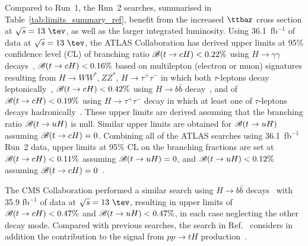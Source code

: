 Compared to Run~1, the Run~2 searches, summarised in Table~\ref{tab:limits_summary_ref}, benefit from the increased $\ttbar$ cross section at $\sqrt{s}=13~\tev$, as well as the larger integrated luminosity.
Using 36.1~fb$^{-1}$ of data at $\sqrt{s}=13~\tev$, the ATLAS Collaboration has derived upper limits at 95\% confidence level (CL) of branching ratio
$\mathscr{B}(t\to cH)<0.22\%$ using $H\to \gamma\gamma$ decays~\cite{Aaboud:2017mfd}, $\mathscr{B}(t\to cH)<0.16\%$ based on
multilepton (electron or muon) signatures resulting from 
$H \to  WW^*, ZZ^*$, $H\to \tau^+\tau^-$ in which both $\tau$-leptons decay leptonically~\cite{Aaboud:2018pob},
$\mathscr{B}(t\to cH)<0.42\%$ using $H\to b\bar{b}$ decay~\cite{fcnc36}, and of $\mathscr{B}(t\to cH)<0.19\%$ using $H\to \tau^+\tau^-$ decay in which at least
one of $\tau$-leptons decays hadronically~\cite{fcnc36}.  
These upper limits are derived assuming that the branching ratio $\mathscr{B}(t\to uH)$ is null. Similar upper limits are obtained for $\mathscr{B}(t\to uH)$ assuming $\mathscr{B}(t\to cH)=0$.
Combining all of the ATLAS searches using 36.1~fb$^{-1}$ Run~2 data, upper limits at 95\% CL on the branching fractions are 
set at $\mathscr{B}(t\to cH)<0.11\%$ assuming $\mathscr{B}(t\to uH)=0$, and $\mathscr{B}(t\to uH)<0.12\%$ assuming $\mathscr{B}(t\to cH)=0$~\cite{fcnc36}.

The CMS Collaboration performed a similar search using  
$H\to b\bar{b}$ decays~\cite{Sirunyan:2017uae} with 35.9 fb$^{-1}$ of data at $\sqrt{s}=13~\tev$, resulting 
in upper limits of $\mathscr{B}(t\to cH)<0.47\%$ and $\mathscr{B}(t\to uH)<0.47\%$, in each case neglecting the other decay mode.
Compared with previous searches, the search in Ref.~\cite{Sirunyan:2017uae} considers in addition the contribution to the signal from 
$pp \to tH$ production~\cite{Greljo:2014dka}. 


